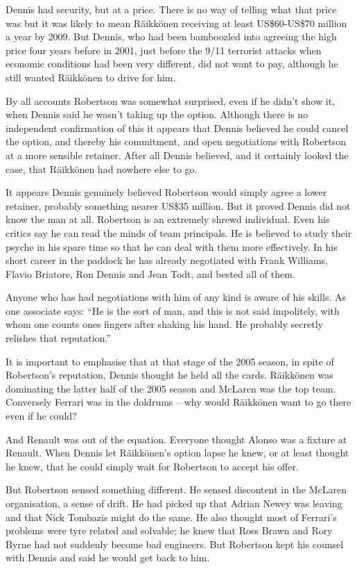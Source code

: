 \documentclass{article}
\begin{document}
Dennis had security, but at a price. There is no way of telling what that price was but it was likely to mean Räikkönen receiving at least US\$60-US\$70 million a year by 2009. But Dennis, who had been bamboozled into agreeing the high price four years before in 2001, just before the 9/11 terrorist attacks when economic conditions had been very different, did not want to pay, although he still wanted Räikkönen to drive for him.

By all accounts Robertson was somewhat surprised, even if he didn’t show it, when Dennis said he wasn’t taking up the option. Although there is no independent confirmation of this it appears that Dennis believed he could cancel the option, and thereby his commitment, and open negotiations with Robertson at a more sensible retainer. After all Dennis believed, and it certainly looked the case, that Räikkönen had nowhere else to go.

It appears Dennis genuinely believed Robertson would simply agree a lower retainer, probably something nearer US\$35 million. But it proved Dennis did not know the man at all. Robertson is an extremely shrewd individual. Even his critics say he can read the minds of team principals. He is believed to study their psyche in his spare time so that he can deal with them more effectively. In his short career in the paddock he has already negotiated with Frank Williams, Flavio Briatore, Ron Dennis and Jean Todt, and bested all of them.

Anyone who has had negotiations with him of any kind is aware of his skills. As one associate says: “He is the sort of man, and this is not said impolitely, with whom one counts ones fingers after shaking his hand. He probably secretly relishes that reputation.”

It is important to emphasise that at that stage of the 2005 season, in spite of Robertson’s reputation, Dennis thought he held all the cards. Räikkönen was dominating the latter half of the 2005 season and McLaren was the top team. Conversely Ferrari was in the doldrums – why would Räikkönen want to go there even if he could?

And Renault was out of the equation. Everyone thought Alonso was a fixture at Renault. When Dennis let Räikkönen’s option lapse he knew, or at least thought he knew, that he could simply wait for Robertson to accept his offer.

But Robertson sensed something different. He sensed discontent in the McLaren organisation, a sense of drift. He had picked up that Adrian Newey was leaving and that Nick Tombazis might do the same. He also thought most of Ferrari’s problems were tyre related and solvable; he knew that Ross Brawn and Rory Byrne had not suddenly become bad engineers.
But Robertson kept his counsel with Dennis and said he would get back to him.
\end{document}
